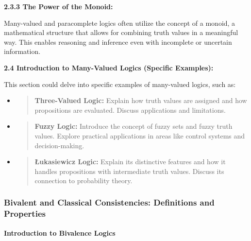 \textbf{2.3.3 The Power of the Monoid:}

Many-valued and paracomplete logics often utilize the concept of a
monoid, a mathematical structure that allows for combining truth values
in a meaningful way. This enables reasoning and inference even with
incomplete or uncertain information.

\textbf{2.4 Introduction to Many-Valued Logics (Specific Examples):}

This section could delve into specific examples of many-valued logics,
such as:

\begin{itemize}
\item
  \begin{quote}
  \textbf{Three-Valued Logic:} Explain how truth values are assigned and
  how propositions are evaluated. Discuss applications and limitations.
  \end{quote}
\item
  \begin{quote}
  \textbf{Fuzzy Logic:} Introduce the concept of fuzzy sets and fuzzy
  truth values. Explore practical applications in areas like control
  systems and decision-making.
  \end{quote}
\item
  \begin{quote}
  \textbf{Łukasiewicz Logic:} Explain its distinctive features and how
  it handles propositions with intermediate truth values. Discuss its
  connection to probability theory.
  \end{quote}
\end{itemize}

\hypertarget{bivalent-and-classical-consistencies-definitions-and-properties}{%
\subsubsection*{Bivalent and Classical Consistencies: Definitions and
Properties}\label{bivalent-and-classical-consistencies-definitions-and-properties}}

\hypertarget{introduction-to-bivalence-logics}{%
\paragraph*{Introduction to Bivalence
Logics}\label{introduction-to-bivalence-logics}}


